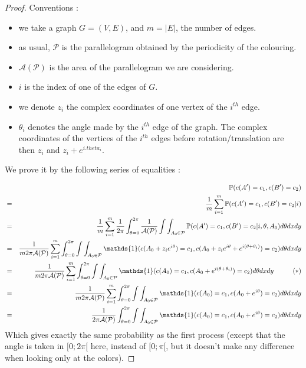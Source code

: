 \documentclass[a4paper,11pt]{article}
\theoremstyle{definition}
\theoremstyle{remark}
\begin{document}
\begin{proof}
Conventions : 
\begin{itemize}
\item we take a graph $G=(V,E)$, and $m = |E|$, the number of edges.

\item as usual, $\mathcal{P}$ is the parallelogram obtained by the periodicity of the colouring.

\item $\mathcal{A(P)}$ is the area of the parallelogram we are considering.

\item $i$ is the index of one of the edges of $G$.

\item we denote $z_i$ the complex coordinates of one vertex of the $i^{th}$ edge.

\item $\theta_i$ denotes the angle made by the $i^{th}$ edge of the graph. The complex coordinates of the vertices of the $i^{th}$ edges before rotation/translation are then $z_i $ and $z_i + e^{i.theta_i}$.

\end{itemize}

We prove it by the following series of equalities :

\begin{eqnarray*}
& & \mathbb{P}(c(A') = c_1, c(B') = c_2) \\
  &=& \frac{1}{m}\sum_{i=1}^{m} \mathbb{P}(c(A') = c_1, c(B') = c_2 | i)  \\
  &=& \frac{1}{m}\sum_{i=1}^{m}  \frac{1}{2\pi}\int_{\theta =0} ^{2\pi} \frac{1}{\mathcal{A(P)}}\int\int_{A_0 \in \mathcal{P}} \mathbb{P}(c(A') = c_1, c(B') = c_2 | i, \theta, A_0) d\theta dx dy \\  
  &=& \frac{1}{m 2\pi \mathcal{A(P)}}\sum_{i=1}^{m}\int_{\theta =0} ^{2\pi} \int\int_{A_0 \in \mathcal{P}} \mathds{1}(c(A_0 + z_i e^{i\theta}) = c_1, c(A_0 +z_i e^{i\theta} + e^{i (\theta + \theta_i)}) = c_2) d\theta dx dy \\  
    &=& \frac{1}{m 2\pi \mathcal{A(P)}}\sum_{i=1}^{m} \int_{\theta =0} ^{2\pi} \int\int_{A_0 \in \mathcal{P}} \mathds{1}(c(A_0) = c_1, c(A_0 + e^{i (\theta + \theta_i)}) = c_2 ) d\theta dx dy \hspace{1 cm} (*)\\ 
    &=& \frac{1}{m 2\pi \mathcal{A(P)}}\sum_{i=1}^{m} \int_{\theta =0} ^{2\pi} \int\int_{A_0 \in \mathcal{P}} \mathds{1}(c(A_0) = c_1, c(A_0 + e^{i \theta}) = c_2 ) d\theta dx dy \\ 
    &=& \frac{1}{2\pi \mathcal{A(P)}}\int_{\theta =0} ^{2\pi} \int\int_{A_0 \in \mathcal{P}} \mathds{1}(c(A_0) = c_1, c(A_0 + e^{i \theta}) = c_2 ) d\theta dx dy \\ 
\end{eqnarray*}
Which gives exactly the same probability as the first process (except that the angle is taken in $[0;2\pi[$ here, instead of $[0;\pi[$, but it doesn't make any difference when looking only at the colors).


\end{proof}
\end{document}
